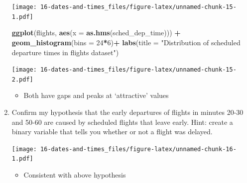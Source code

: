 \documentclass[]{book}
\newenvironment{Shaded}{\begin{snugshade}}{\end{snugshade}}
\newcommand{\DataTypeTok}[1]{\textcolor[rgb]{0.13,0.29,0.53}{#1}}
\newcommand{\DecValTok}[1]{\textcolor[rgb]{0.00,0.00,0.81}{#1}}
\newcommand{\KeywordTok}[1]{\textcolor[rgb]{0.13,0.29,0.53}{\textbf{#1}}}
\newcommand{\NormalTok}[1]{#1}
\newcommand{\OperatorTok}[1]{\textcolor[rgb]{0.81,0.36,0.00}{\textbf{#1}}}
\newcommand{\StringTok}[1]{\textcolor[rgb]{0.31,0.60,0.02}{#1}}
\providecommand{\tightlist}{%
  \setlength{\itemsep}{0pt}\setlength{\parskip}{0pt}}
\theoremstyle{definition}
\theoremstyle{definition}
\theoremstyle{definition}
\theoremstyle{remark}
\begin{document}
\begin{enumerate}
  \texttt{[image: 16-dates-and-times\_files/figure-latex/unnamed-chunk-15-1.pdf]}

\begin{Shaded}
\begin{Highlighting}[]
\KeywordTok{ggplot}\NormalTok{(flights, }\KeywordTok{aes}\NormalTok{(}\DataTypeTok{x =} \KeywordTok{as.hms}\NormalTok{(sched_dep_time))) }\OperatorTok{+}
\StringTok{  }\KeywordTok{geom_histogram}\NormalTok{(}\DataTypeTok{bins =} \DecValTok{24}\OperatorTok{*}\DecValTok{6}\NormalTok{)}\OperatorTok{+}
\StringTok{  }\KeywordTok{labs}\NormalTok{(}\DataTypeTok{title =} \StringTok{"Distribution of scheduled departure times in flights dataset"}\NormalTok{)}
\end{Highlighting}
\end{Shaded}

  \texttt{[image: 16-dates-and-times\_files/figure-latex/unnamed-chunk-15-2.pdf]}

  \begin{itemize}
  \tightlist
  \item
    Both have gaps and peaks at `attractive' values
  \end{itemize}
\item
  Confirm my hypothesis that the early departures of flights in minutes
  20-30 and 50-60 are caused by scheduled flights that leave early.
  Hint: create a binary variable that tells you whether or not a flight
  was delayed.

\begin{Shaded}
\end{Shaded}

  \texttt{[image: 16-dates-and-times\_files/figure-latex/unnamed-chunk-16-1.pdf]}

  \begin{itemize}
  \tightlist
  \item
    Consistent with above hypothesis
  \end{itemize}
\end{enumerate}
\end{document}
